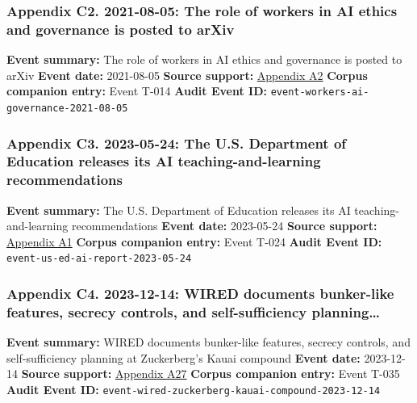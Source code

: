 \documentclass[
  american,
  11pt,
  letterpaper,
]{article}
\begin{document}
\subsubsection{Appendix C2. 2021-08-05: The role of workers in AI ethics
and governance is posted to
arXiv}\label{appendix-c2-2021-08-05-the-role-of-workers-in-ai-ethics-and-governance-is-posted-to-arxiv}

\textbf{Event summary:} The role of workers in AI ethics and governance
is posted to arXiv \textbf{Event date:} 2021-08-05 \textbf{Source
support:}
\hyperref[appendix-a2-in-oxford-handbook-on-ai-governance-the-role-of-workers-in-ai-ethics-and-governance]{Appendix
A2} \textbf{Corpus companion entry:} Event T-014 \textbf{Audit Event
ID:} \texttt{event-workers-ai-governance-2021-08-05}

\subsubsection{Appendix C3. 2023-05-24: The U.S. Department of Education
releases its AI teaching-and-learning
recommendations}\label{appendix-c3-2023-05-24-the-u-s-department-of-education-releases-its-ai-teaching-and-learning-recommendations}

\textbf{Event summary:} The U.S. Department of Education releases its AI
teaching-and-learning recommendations \textbf{Event date:} 2023-05-24
\textbf{Source support:}
\hyperref[appendix-a1-artificial-intelligence-and-the-future-of-teaching-and-learning-insights-and-recommendations]{Appendix
A1} \textbf{Corpus companion entry:} Event T-024 \textbf{Audit Event
ID:} \texttt{event-us-ed-ai-report-2023-05-24}

\subsubsection{Appendix C4. 2023-12-14: WIRED documents bunker-like
features, secrecy controls, and self-sufficiency
planning\ldots{}}\label{appendix-c4-2023-12-14-wired-documents-bunker-like-features-secrecy-controls-and-self-sufficiency-planning-at-zuckerberg-s-kauai-compound}

\textbf{Event summary:} WIRED documents bunker-like features, secrecy
controls, and self-sufficiency planning at Zuckerberg's Kauai compound
\textbf{Event date:} 2023-12-14 \textbf{Source support:}
\hyperref[appendix-a27-inside-mark-zuckerbergs-top-secret-hawaii-compound]{Appendix
A27} \textbf{Corpus companion entry:} Event T-035 \textbf{Audit Event
ID:} \texttt{event-wired-zuckerberg-kauai-compound-2023-12-14}
\end{document}
